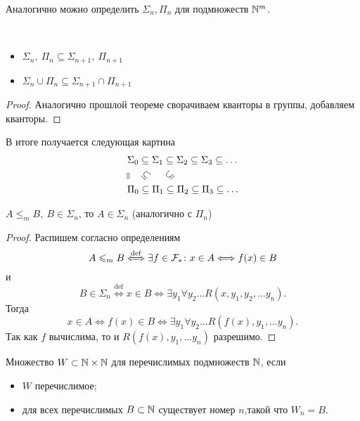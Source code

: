 \begin{note}
    Аналогично можно определить $ \Sigma _n, \Pi_n$ для подмножеств $ \mathbb{N}^{m}$.
\end{note}
\begin{prop}
	~\begin{itemize}
		\item $ \Sigma _n, ~ \Pi _n \subseteq \Sigma _{n+1}, ~\Pi_{n+1}$
	\item $ \Sigma _n \cup \Pi _n \subseteq \Sigma _{n+1} \cap \Pi _{n+1}$
	\end{itemize}
\end{prop}
\begin{proof}
    Аналогично прошлой теореме сворачиваем кванторы в группы, добавляем кванторы.
\end{proof}

В итоге получается следующая картина
\begin{align*}
	& \Sigma_0 \subseteq \Sigma _1 \subseteq  \Sigma _2 \subseteq \Sigma _3 \subseteq \ldots \\
	&\rotatebox[origin=c]{90}{=} \quad \rotatebox[origin=c]{-45}{$\subseteq$} \quad~  \rotatebox[origin=c]{45}{$\subseteq$}\\
	& \Pi_0 \subseteq \Pi _1 \subseteq  \Pi _2 \subseteq \Pi _3 \subseteq \ldots
\end{align*}

\begin{thm}
    $ A \le _m B ,  ~ B \in \Sigma _n$, то $ A \in \Sigma _{n}$ (аналогично с $ \Pi_n$)   
\end{thm}
\begin{proof}
	Распишем согласно определениям
	\[
		A \leqslant _m B \stackrel{\operatorname{def}}{\Longleftrightarrow }  \exists f \in \mathcal{F}_{*}\colon x \in A \Longleftrightarrow f(x) \in  B
	\] 
	и
	\[
		B \in \Sigma _n \stackrel{\operatorname{def}}{\Longleftrightarrow } x \in B \Longleftrightarrow \exists y_1 \forall y_2 \ldots R(x, y_1, y_2, \ldots y_n)
	.\] 
	Тогда 
	\[
		x \in A \Longleftrightarrow f(x) \in B \Longleftrightarrow \exists y_1 \forall y_2 \ldots R(f(x), y_1, \ldots y_{n})
	.\] 
	Так как $ f$ вычислима, то и $ R(f(x), y_1, \ldots y_n)$ разрешимо.
\end{proof}

\begin{defn}
	Множество $ W \subset \mathbb{N} \times \mathbb{N}$  для перечислимых подмножеств $ \mathbb{N}$, если
	\begin{itemize}
		\item $ W $ перечислимое;
		\item для всех перечислимых $ B \subset \mathbb{N}$ существует номер $ n$,такой что $ W_n = B$.
	\end{itemize}
\end{defn}

